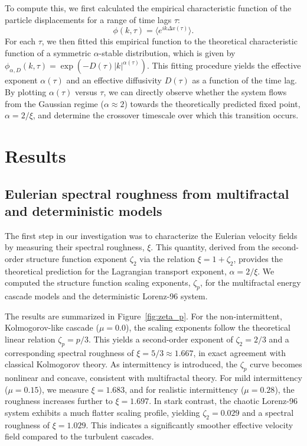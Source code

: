 \documentclass[]{article}
\begin{document}
To compute this, we first calculated the empirical characteristic function of the particle displacements for a range of time lags $\tau$:
\begin{equation}
\phi(k, \tau) = \langle e^{ik\Delta x(\tau)} \rangle.
\end{equation}
For each $\tau$, we then fitted this empirical function to the theoretical characteristic function of a symmetric $\alpha$-stable distribution, which is given by $\phi_{\alpha, D}(k, \tau) = \exp(-D(\tau)|k|^{\alpha(\tau)})$. This fitting procedure yields the effective exponent $\alpha(\tau)$ and an effective diffusivity $D(\tau)$ as a function of the time lag. By plotting $\alpha(\tau)$ versus $\tau$, we can directly observe whether the system flows from the Gaussian regime ($\alpha \approx 2$) towards the theoretically predicted fixed point, $\alpha = 2/\xi$, and determine the crossover timescale over which this transition occurs.

\section{Results}
\label{sec:results}
\subsection{Eulerian spectral roughness from multifractal and deterministic models}

The first step in our investigation was to characterize the Eulerian velocity fields by measuring their spectral roughness, $\xi$. This quantity, derived from the second-order structure function exponent $\zeta_2$ via the relation $\xi = 1 + \zeta_2$, provides the theoretical prediction for the Lagrangian transport exponent, $\alpha = 2/\xi$. We computed the structure function scaling exponents, $\zeta_p$, for the multifractal energy cascade models and the deterministic Lorenz-96 system.

The results are summarized in Figure~\ref{fig:zeta_p}. For the non-intermittent, Kolmogorov-like cascade ($\mu=0.0$), the scaling exponents follow the theoretical linear relation $\zeta_p = p/3$. This yields a second-order exponent of $\zeta_2 = 2/3$ and a corresponding spectral roughness of $\xi = 5/3 \approx 1.667$, in exact agreement with classical Kolmogorov theory. As intermittency is introduced, the $\zeta_p$ curve becomes nonlinear and concave, consistent with multifractal theory. For mild intermittency ($\mu=0.15$), we measure $\xi = 1.683$, and for realistic intermittency ($\mu=0.28$), the roughness increases further to $\xi = 1.697$. In stark contrast, the chaotic Lorenz-96 system exhibits a much flatter scaling profile, yielding $\zeta_2 = 0.029$ and a spectral roughness of $\xi = 1.029$. This indicates a significantly smoother effective velocity field compared to the turbulent cascades.
\end{document}
